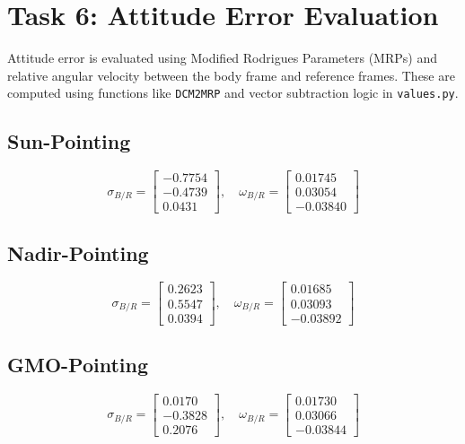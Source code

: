 \documentclass[conf]{article}
\begin{document}
\section{Task 6: Attitude Error Evaluation}
Attitude error is evaluated using Modified Rodrigues Parameters (MRPs) and relative angular velocity between the body frame and reference frames. These are computed using functions like \texttt{DCM2MRP} and vector subtraction logic in \texttt{values.py}.

\subsection*{Sun-Pointing}
\[
\sigma_{B/R} =
\begin{bmatrix}
-0.7754 \\ -0.4739 \\ 0.0431
\end{bmatrix}, \quad
\omega_{B/R} =
\begin{bmatrix}
0.01745 \\ 0.03054 \\ -0.03840
\end{bmatrix}
\]

\subsection*{Nadir-Pointing}
\[
\sigma_{B/R} =
\begin{bmatrix}
0.2623 \\ 0.5547 \\ 0.0394
\end{bmatrix}, \quad
\omega_{B/R} =
\begin{bmatrix}
0.01685 \\ 0.03093 \\ -0.03892
\end{bmatrix}
\]

\subsection*{GMO-Pointing}
\[
\sigma_{B/R} =
\begin{bmatrix}
0.0170 \\ -0.3828 \\ 0.2076
\end{bmatrix}, \quad
\omega_{B/R} =
\begin{bmatrix}
0.01730 \\ 0.03066 \\ -0.03844
\end{bmatrix}
\]
\end{document}
